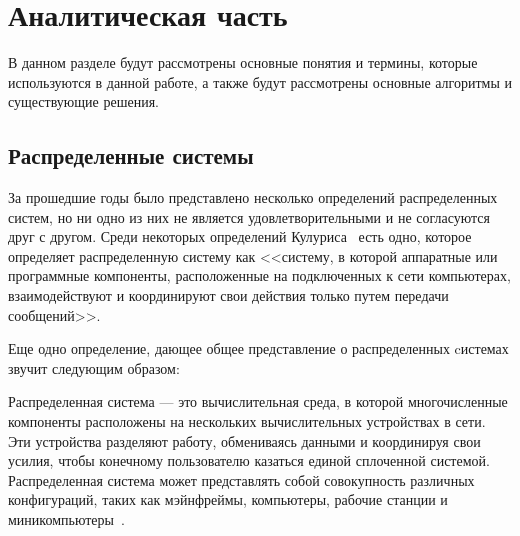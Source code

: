 
\section{Аналитическая часть}

В данном разделе будут рассмотрены основные понятия и термины, которые используются в данной работе, а также будут рассмотрены основные алгоритмы и существующие решения. 

\subsection{Распределенные системы}


За прошедшие годы было представлено несколько определений распределенных систем, но ни одно из них не является удовлетворительными и не согласуются друг с другом. 
Среди некоторых определений Кулуриса~\cite{2009distributed} есть одно, которое определяет распределенную систему как <<систему, в которой аппаратные или программные компоненты, расположенные на подключенных к сети компьютерах, взаимодействуют и координируют свои действия только путем передачи сообщений>>.

Еще одно определение, дающее общее представление о распределенных cистемах звучит следующим образом:

Распределенная система --- это вычислительная среда, в которой многочисленные компоненты расположены на нескольких вычислительных устройствах в сети. 
Эти устройства разделяют работу, обмениваясь данными и координируя свои усилия, чтобы конечному пользователю казаться единой сплоченной системой. 
Распределенная система может представлять собой совокупность различных конфигураций, таких как мэйнфреймы, компьютеры, рабочие станции и миникомпьютеры~\cite{khole2023compendium}.

